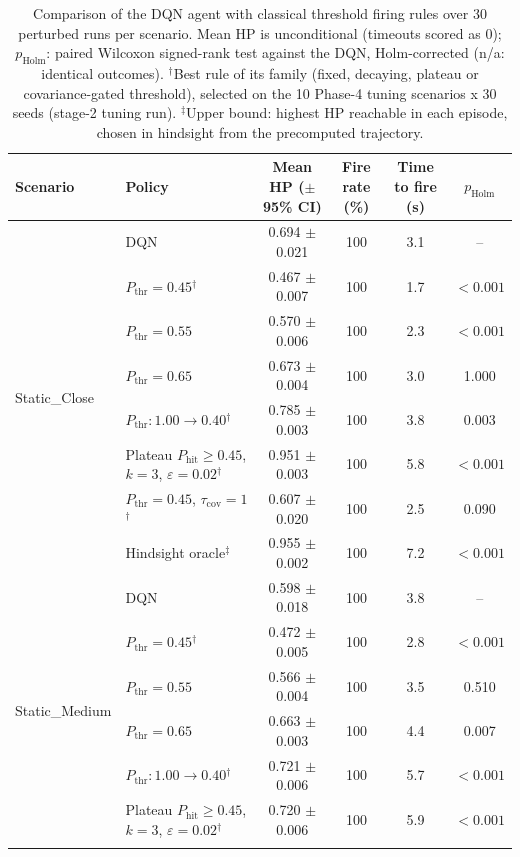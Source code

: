 \begin{table}[htbp]
\centering
\caption{Comparison of the DQN agent with classical threshold firing rules over 30 perturbed runs per scenario. Mean HP is unconditional (timeouts scored as 0); $p_{\mathrm{Holm}}$: paired Wilcoxon signed-rank test against the DQN, Holm-corrected (n/a: identical outcomes). $^{\dagger}$Best rule of its family (fixed, decaying, plateau or covariance-gated threshold), selected on the 10 Phase-4 tuning scenarios x 30 seeds (stage-2 tuning run). $^{\ddagger}$Upper bound: highest HP reachable in each episode, chosen in hindsight from the precomputed trajectory.}
\label{tab:comparison-traditional-rl}
\small
\begin{tabular}{llcccc}
\toprule
\textbf{Scenario} & \textbf{Policy} & \textbf{Mean HP ($\pm$95\% CI)} & \textbf{Fire rate (\%)} & \textbf{Time to fire (s)} & $p_{\mathrm{Holm}}$ \\
\midrule
\multirow{8}{*}{Static\_Close} & DQN & 0.694 $\pm$ 0.021 & 100 & 3.1 & -- \\
 & $P_{\mathrm{thr}}=0.45$$^{\dagger}$ & 0.467 $\pm$ 0.007 & 100 & 1.7 & $<0.001$ \\
 & $P_{\mathrm{thr}}=0.55$ & 0.570 $\pm$ 0.006 & 100 & 2.3 & $<0.001$ \\
 & $P_{\mathrm{thr}}=0.65$ & 0.673 $\pm$ 0.004 & 100 & 3.0 & 1.000 \\
 & $P_{\mathrm{thr}}: 1.00 \to 0.40$$^{\dagger}$ & 0.785 $\pm$ 0.003 & 100 & 3.8 & 0.003 \\
 & Plateau $P_{\mathrm{hit}}\geq0.45$, $k=3$, $\varepsilon=0.02$$^{\dagger}$ & 0.951 $\pm$ 0.003 & 100 & 5.8 & $<0.001$ \\
 & $P_{\mathrm{thr}}=0.45$, $\tau_{\mathrm{cov}}=1$$^{\dagger}$ & 0.607 $\pm$ 0.020 & 100 & 2.5 & 0.090 \\
 & Hindsight oracle$^{\ddagger}$ & 0.955 $\pm$ 0.002 & 100 & 7.2 & $<0.001$ \\
\midrule
\multirow{8}{*}{Static\_Medium} & DQN & 0.598 $\pm$ 0.018 & 100 & 3.8 & -- \\
 & $P_{\mathrm{thr}}=0.45$$^{\dagger}$ & 0.472 $\pm$ 0.005 & 100 & 2.8 & $<0.001$ \\
 & $P_{\mathrm{thr}}=0.55$ & 0.566 $\pm$ 0.004 & 100 & 3.5 & 0.510 \\
 & $P_{\mathrm{thr}}=0.65$ & 0.663 $\pm$ 0.003 & 100 & 4.4 & 0.007 \\
 & $P_{\mathrm{thr}}: 1.00 \to 0.40$$^{\dagger}$ & 0.721 $\pm$ 0.006 & 100 & 5.7 & $<0.001$ \\
 & Plateau $P_{\mathrm{hit}}\geq0.45$, $k=3$, $\varepsilon=0.02$$^{\dagger}$ & 0.720 $\pm$ 0.006 & 100 & 5.9 & $<0.001$ \\
$$
\end{tabular}
\end{table}
